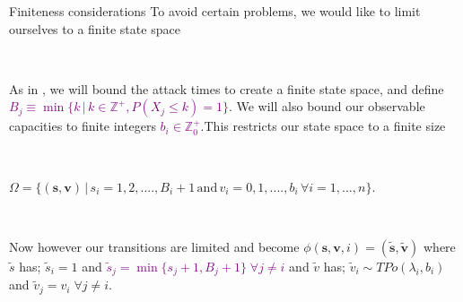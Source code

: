 \documentclass[10pt]{beamer}
\begin{document}
\begin{frame}{Finiteness considerations}
To avoid certain problems, we would like to limit ourselves to a finite state space

\

As in \cite{Lin2013}, we will bound the attack times to create a finite state space, and define \textcolor{purple}{$B_{j} \equiv \min \{ k \, | \, k \in \mathbb{Z}^{+} , P(X_{j} \leq k)=1 \}$}. We will also bound our observable capacities to finite integers \textcolor{purple}{$b_{i} \in \mathbb{Z}^{+}_{0}$}.This restricts our state space to a finite size

\

$\Omega=\{(\bm{s},\bm{v}) \, | \, s_{i}=1,2,....,B_{i}+1 \, \text{and}  \, v_{i}=0,1,....,b_{i} \, \forall i=1,...,n  \}$.

\
\pause

Now however our transitions are limited and become $\phi(\bm{s},\bm{v},i)=(\widetilde{\bm{s}},\widetilde{\bm{v}})$ where $\widetilde{s}$ has; $\widetilde{s}_{i}=1$ and \textcolor{purple}{$\widetilde{s}_{j}=\min \{s_{j}+1,B_{j}+1 \} \; \forall j \neq i$} and $\widetilde{v}$ has; $\widetilde{v}_{i} \sim TPo(\lambda_{i},b_{i})$ and  $\widetilde{v}_{j}=v_{i} \; \forall j \neq i$.

\end{frame}
\end{document}
